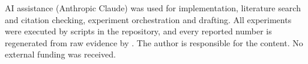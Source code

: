 \begin{ack}
AI assistance (Anthropic Claude) was used for implementation, literature search and citation checking, experiment orchestration and drafting. All experiments were executed by scripts in the repository, and every reported number is regenerated from raw evidence by . The author is responsible for the content. No external funding was received.
\end{ack}
